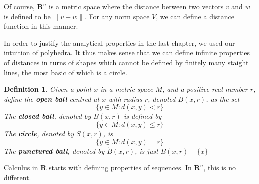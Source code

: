 \documentclass[12pt]{amsbook}
\theoremstyle{plain}
\newtheorem{definition}{Definition}
\theoremstyle{definition}
\begin{document}
Of course, $\mathbf{R}^n$ is a metric space where the distance between two vectors $v$ and $w$ is defined to be $\|v - w\|$. For any norm space $V$, we can define a distance function in this manner.

In order to justify the analytical properties in the last chapter, we used our intuition of polyhedra. It thus makes sense that we can define infinite properties of distances in turns of shapes which cannot be defined by finitely many staight lines, the most basic of which is a circle.

\begin{definition}
  Given a point $x$ in a metric space $M$, and a positive real number $r$, define the {\bf open ball} centred at $x$ with radius $r$, denoted $B(x,r)$, as the set
  \[ \{ y \in M : d(x,y) < r \} \]
  The {\bf closed ball}, denoted by $\overline{B}(x,r)$ is defined by
  \[ \{ y \in M : d(x,y) \leq r \} \]
  The {\bf circle}, denoted by $S(x,r)$, is
  \[ \{ y \in M : d(x,y) = r \} \]
  The {\bf punctured ball}, denoted by $\mathring{B}(x,r)$, is just $B(x,r) - \{x\}$
\end{definition}

Calculus in $\mathbf{R}$ starts with defining properties of sequences. In $\mathbf{R}^n$, this is no different.
\end{document}
